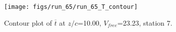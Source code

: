 \begin{figure}[H]
\centering
\texttt{[image: figs/run\_65/run\_65\_T\_contour]}
\caption{Contour plot of $\overline{t}$ at $z/c$=10.00, $V_{free}$=23.23, station 7.}
\label{fig:run_65_T_contour}
\end{figure}


